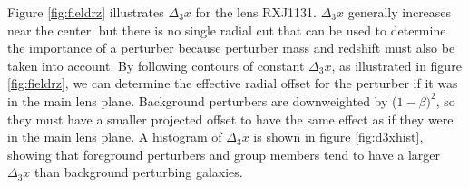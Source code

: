 Figure \ref{fig:fieldrz} illustrates $\Delta_3 x$ for the lens RXJ1131. $\Delta_3 x$ generally increases near the center, but there is no single radial cut that can be used to determine the importance of a perturber because perturber mass and redshift must also be taken into account. By following contours of constant $\Delta_3 x$, as illustrated in figure \ref{fig:fieldrz}, we can determine the effective radial offset for the perturber if it was in the main lens plane. Background perturbers are downweighted by ($1-\beta)^2$, so they must have a smaller projected offset to have the same effect as if they were in the main lens plane. A histogram of $\Delta_3 x$ is shown in figure \ref{fig:d3xhist}, showing that foreground perturbers and group members tend to have a larger $\Delta_3 x$ than background perturbing galaxies.
  
  
  
  
  